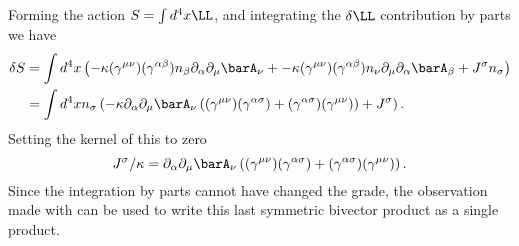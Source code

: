 Forming the action \(S = \int d^4 x \LL\), and integrating the \(\delta \LL\) contribution by parts we have
%
\begin{equation}\label{eqn:lagrangianFieldDensity:400}
\begin{aligned}
\delta S
&=
\int d^4 x
\left(
-\kappa (\gamma^{\mu\nu})(\gamma^{\alpha\beta}) n_{\beta} \partial_{\alpha} \partial_{\mu} \barA_{\nu}
+-\kappa (\gamma^{\mu\nu})(\gamma^{\alpha\beta}) n_{\nu} \partial_{\mu} \partial_{\alpha} \barA_{\beta}
+ J^{\sigma} n_{\sigma}
\right) \\
&=
\int d^4 x n_{\sigma}
\left(
-\kappa \partial_{\alpha} \partial_{\mu} \barA_{\nu} \left( (\gamma^{\mu\nu})(\gamma^{\alpha\sigma}) + (\gamma^{\alpha\sigma})(\gamma^{\mu\nu}) \right)
+ J^{\sigma}
\right) .
\end{aligned}
\end{equation}
%
Setting the kernel of this to zero
%
\begin{equation}\label{eqn:lagrangianFieldDensity:420}
J^{\sigma}/\kappa
=
\partial_{\alpha} \partial_{\mu} \barA_{\nu} \left( (\gamma^{\mu\nu})(\gamma^{\alpha\sigma}) + (\gamma^{\alpha\sigma})(\gamma^{\mu\nu}) \right) .
\end{equation}
%
Since the integration by parts cannot have changed the grade, the observation made with  can be used to
write this last symmetric bivector product as a single product.

